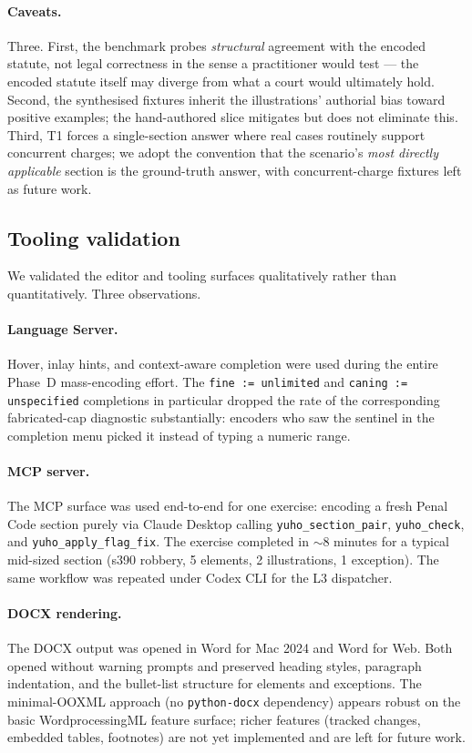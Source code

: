 \paragraph{Caveats.} Three. First, the benchmark probes
\emph{structural} agreement with the encoded statute, not legal
correctness in the sense a practitioner would test --- the
encoded statute itself may diverge from what a court would
ultimately hold. Second, the synthesised fixtures inherit the
illustrations' authorial bias toward positive examples; the
hand-authored slice mitigates but does not eliminate this. Third,
T1 forces a single-section answer where real cases routinely
support concurrent charges; we adopt the convention that the
scenario's \emph{most directly applicable} section is the
ground-truth answer, with concurrent-charge fixtures left as
future work.

\subsection{Tooling validation}
\label{subsec:tooling_eval}

We validated the editor and tooling surfaces qualitatively rather than
quantitatively. Three observations.

\paragraph{Language Server.} Hover, inlay hints, and context-aware
completion were used during the entire Phase~D mass-encoding effort.
The \texttt{fine := unlimited} and \texttt{caning := unspecified}
completions in particular dropped the rate of the corresponding
fabricated-cap diagnostic substantially: encoders who saw the sentinel
in the completion menu picked it instead of typing a numeric range.

\paragraph{MCP server.} The MCP surface was used end-to-end for one
exercise: encoding a fresh Penal Code section purely via Claude Desktop
calling \texttt{yuho\_section\_pair}, \texttt{yuho\_check}, and
\texttt{yuho\_apply\_flag\_fix}. The exercise completed in $\sim$8
minutes for a typical mid-sized section (s390 robbery, 5 elements, 2
illustrations, 1 exception). The same workflow was repeated under
Codex CLI for the L3 dispatcher.

\paragraph{DOCX rendering.} The DOCX output was opened in Word for Mac
2024 and Word for Web. Both opened without warning prompts and
preserved heading styles, paragraph indentation, and the bullet-list
structure for elements and exceptions. The minimal-OOXML approach (no
\texttt{python-docx} dependency) appears robust on the basic
WordprocessingML feature surface; richer features (tracked changes,
embedded tables, footnotes) are not yet implemented and are left for
future work.

